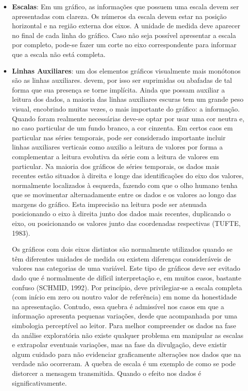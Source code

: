 \begin{itemize}
\item \textbf{Escalas}: Em um gráfico, as informações que possuem uma escala devem ser apresentadas com clareza. Os números da escala devem estar na posição horizontal e na região
externa dos eixos. A unidade de medida deve aparecer no final de cada linha do gráfico. Caso não seja possível apresentar a escala por completo, pode-se fazer um corte no eixo correspondente para informar que a escala não está completa.

\item \textbf{Linhas Auxiliares}: um dos elementos gráficos visualmente mais monótonos são as linhas auxiliares. devem, por isso ser suprimidas ou abafadas de tal forma que sua presença se torne implícita. Ainda que possam auxiliar a leitura dos dados, a maioria das linhas auxiliares escuras tem um grande peso visual, encobrindo muitas vezes, o mais importante do gráfico: a informação. Quando foram realmente necessárias deve-se optar por usar uma cor neutra e, no caso particular de um fundo branco, a cor cinzenta. Em certos caos em particular nas séries temporais, pode ser considerado importante incluir linhas auxiliares verticais como auxilio a leitura de valores por forma a complementar a leitura evolutiva da série com a leitura de valores em particular. Na maioria dos gráficos de séries temporais, os dados mais recentes estão situados à direita e longe das identificações do eixo dos valores, normalmente localizados à esquerda, fazendo com que o olho humano tenha que se movimentar alternadamente entre os dados e os valores ao longo das margens do gráfico. Esta imprecisão na leitura pode ser atenuada posicionando o eixo à direita junto dos dados mais recentes, duplicando o eixo, ou posicionando os valores junto das coordenadas respectivas (TUFTE, 1983).\vskip0.3cm


\inic Os gráficos com dois eixos distintos são normalmente utilizados quando se têm diferentes unidades de medida ou existem diferenças consideráveis de valores nas categorias de uma variável. Este tipo de gráficos deve ser evitado dado que é normalmente de difícil interpretação e, em muitos casos, bastante confuso (SCHMID, 1992). Por princípio, deve privilegiar-se a escala completa (com início em zero ou noutro valor de referência) em nome da honestidade na apresentação. Contudo, essa quebra é admissível nos casos em que a informação apresenta pequenas variações, desde que acompanhada por uma simbologia perceptível ao leitor. Para melhor compreender os dados na fase da análise exploratória não existe qualquer problema em manipular as escalas e extrapolar eventuais variações, mas na fase da divulgação, deve existir algum cuidado para não evidenciar graficamente alterações nos dados que na verdade não ocorreram. A quebra de escala é um exemplo de como se pode distorcer a mensagem transmitida. Quando o efeito nos dados é significativamente. 
\end{itemize}


